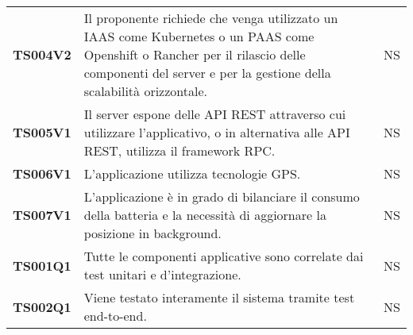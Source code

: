 \documentclass[../piano-di-qualifica.tex]{subfiles}
\begin{document}
\begin{longtable}[H]{>{\centering\bfseries}m{3cm} >{}m{10cm} >{\centering\arraybackslash}m{3cm}}
  TS004V2            & Il proponente richiede che venga utilizzato un IAAS come Kubernetes o un PAAS come Openshift o Rancher per il rilascio delle componenti del server e per la gestione della scalabilità orizzontale.
                     & NS                                                                                                                                                                                                                                                               \\

  TS005V1            & Il server espone delle API REST attraverso cui utilizzare l’applicativo, o in alternativa alle API REST, utilizza il framework RPC\@.
                     & NS                                                                                                                                                                                                                                                               \\

  TS006V1            & L’applicazione utilizza tecnologie GPS\@.
                     & NS                                                                                                                                                                                                                                                               \\

  TS007V1            & L’applicazione è in grado di bilanciare il consumo della batteria e la necessità di aggiornare la posizione in background.
                     & NS                                                                                                                                                                                                                                                               \\

  TS001Q1            & Tutte le componenti applicative sono correlate dai test unitari e d’integrazione.
                     & NS                                                                                                                                                                                                                                                               \\

  TS002Q1            & Viene testato interamente il sistema tramite test end-to-end.
                     & NS                                                                                                                                                                                                                                                               \\


\end{longtable}
\end{document}
